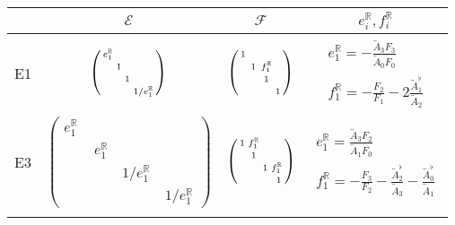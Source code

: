\documentclass[a4paper,12pt,leqno]{amsart}
\numberwithin{equation}{section}
\theoremstyle{plain}
\theoremstyle{definition}
\newcommand{\R}{\mathbb R}
\newcommand{\bsp}{\left(\begin{smallmatrix}}
\newcommand{\esp}{\end{smallmatrix}\right)}
\begin{document}
{\begin{table}[h]
\renewcommand{\arraystretch}{2.0}
\begin{tabular}{c||c|c|c}
& $\mathcal E$ & $\mathcal F$ & $e^\R_i,f^\R_i$
\\
\hline
\vphantom{$\bsp X \\ X \\ X \\ X \\ X \\ X \\ X \esp$}
E1 & 
$\bsp 
e^\R_1 & & & \\
\vphantom{f_1^\R} 
  & 1 &  & \\
  \vphantom{f_1^\R} 
   &  & 1 & \\
    & & & 1/e^\R_1
\esp$
 &
$\bsp 
\vphantom{f_1^\R} 
1 & & & \\
  &\, 1\,  &f^\R_1  & \\
  \vphantom{f_1^\R} 
   &  &\, 1\,  & \\
   \vphantom{f_1^\R} 
    & & &1
\esp$
&
$
\begin{matrix}
e^\R_1=-\frac{\tilde A_3 F_3}{\tilde A_0 F_0}
\\
f^\R_1= - \frac{F_2}{F_1} - 2\frac{\tilde A_1^\flat}{\tilde A_2}
\end{matrix}
$
\\
\vphantom{$\bsp X \\ X \\ X \\ X \\ X \\ X \\ X\esp$}
E3 
& 
$\bsp
e^\R_1\,   & & & \\
  &\,  e^\R_1\,  &  & \\
  & &  1/e^\R_1 & \\
  & & & \ 1/e^\R_1
\esp$
&
$\bsp
1  & f_1^\R & & \\
\vphantom{f_1^\R} 
 & 1 &  & \\
  & &  1 & f_1^\R \\
\vphantom{f_1^\R} 
  & & & \ 1
\esp$
&
$
\begin{matrix}
e^\R_1=\frac{\tilde A_3 F_2}{\tilde A_1 F_0}
\\
f^\R_1= - \frac{F_3}{F_2} - \frac{\tilde A_2^\flat}{\tilde A_3}
 - \frac{\tilde A_0^\flat}{\tilde A_1}
\end{matrix}
$
\\
\hline
\vphantom{$\bsp X \\ X \\ X \\ X \\ X \\ X \\ X \esp$}

\end{tabular}
\end{table}}
\end{document}
